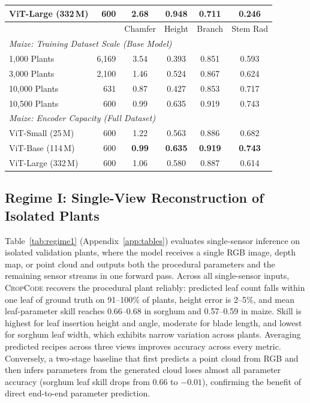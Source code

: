 \documentclass[10pt,twocolumn,letterpaper]{article}
\newcommand{\method}{\textsc{CropCode}}
\begin{document}
\begin{table}[t]
\begin{minipage}[t]{0.45\textwidth}
{\begin{tabular}{l r c ccc}
    ViT-Large (332\,M) & 600 & 2.68 & 0.948 & 0.711 & 0.246 \\
    \midrule
    & & Chamfer & Height & Branch & Stem Rad \\
    \multicolumn{6}{l}{\emph{Maize: Training Dataset Scale (Base Model)}} \\
    1{,}000 Plants & 6{,}169 & 3.54 & 0.393 & 0.851 & 0.593 \\
    3{,}000 Plants & 2{,}100 & 1.46 & 0.524 & 0.867 & 0.624 \\
    10{,}000 Plants & 631 & 0.87 & 0.427 & 0.853 & 0.717 \\
    10{,}500 Plants & 600 & 0.99 & 0.635 & 0.919 & 0.743 \\
    \multicolumn{6}{l}{\emph{Maize: Encoder Capacity (Full Dataset)}} \\
    ViT-Small (25\,M) & 600 & 1.22 & 0.563 & 0.886 & 0.682 \\
    ViT-Base (114\,M) & 600 & \textbf{0.99} & \textbf{0.635} & \textbf{0.919} & \textbf{0.743} \\
    ViT-Large (332\,M) & 600 & 1.06 & 0.580 & 0.887 & 0.614 \\
    \bottomrule
  \end{tabular}}
  \end{minipage}
\end{table}

\subsection{Regime I: Single-View Reconstruction of Isolated Plants}
\label{sec:regime1}\label{sec:exp-regime1}

Table~\ref{tab:regime1} (Appendix~\ref{app:tables}) evaluates single-sensor inference on isolated validation plants, where the model receives a single RGB image, depth map, or point cloud and outputs both the procedural parameters and the remaining sensor streams in one forward pass. Across all single-sensor inputs, \method{} recovers the procedural plant reliably: predicted leaf count falls within one leaf of ground truth on 91--100\% of plants, height error is 2--5\%, and mean leaf-parameter skill reaches 0.66--0.68 in sorghum and 0.57--0.59 in maize. Skill is highest for leaf insertion height and angle, moderate for blade length, and lowest for sorghum leaf width, which exhibits narrow variation across plants. Averaging predicted recipes across three views improves accuracy across every metric. Conversely, a two-stage baseline that first predicts a point cloud from RGB and then infers parameters from the generated cloud loses almost all parameter accuracy (sorghum leaf skill drops from 0.66 to $-0.01$), confirming the benefit of direct end-to-end parameter prediction.
\end{document}
